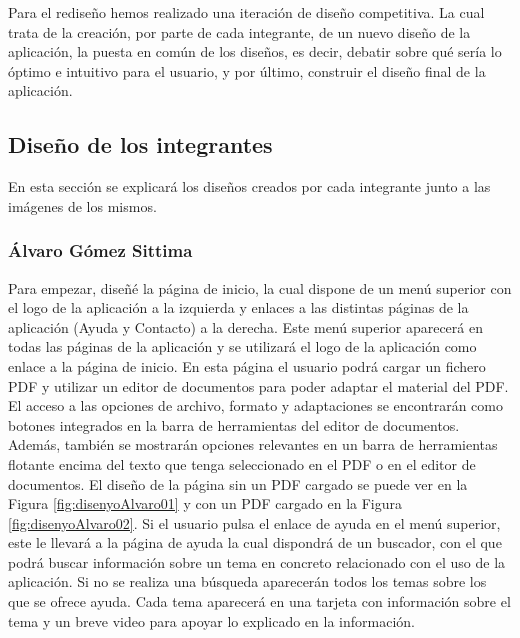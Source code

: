 Para el rediseño hemos realizado una iteración de diseño competitiva. La cual trata de la creación, por parte de cada integrante, de un nuevo diseño de la aplicación, la puesta en común de los diseños, es decir, debatir sobre qué sería lo óptimo e intuitivo para el usuario, y por último, construir el diseño final de la aplicación.

\subsection{Diseño de los integrantes}
En esta sección se explicará los diseños creados por cada integrante junto a las imágenes de los mismos.
\subsubsection{Álvaro Gómez Sittima}
Para empezar, diseñé la página de inicio, la cual dispone de un menú superior con el logo de la aplicación a la izquierda y enlaces a las distintas páginas de la aplicación (Ayuda y Contacto) a la derecha. Este menú superior aparecerá en todas las páginas de la aplicación y se utilizará el logo de la aplicación como enlace a la página de inicio. En esta página el usuario podrá cargar un fichero PDF y utilizar un editor de documentos para poder adaptar el material del PDF. El acceso a las opciones de archivo, formato y adaptaciones se encontrarán como botones integrados en la barra de herramientas del editor de documentos. Además, también se mostrarán opciones relevantes en un barra de herramientas flotante encima del texto que tenga seleccionado en el PDF o en el editor de documentos. El diseño de la página sin un PDF cargado se puede ver en la Figura \ref{fig:disenyoAlvaro01} y con un PDF cargado en la Figura \ref{fig:disenyoAlvaro02}. Si el usuario pulsa el enlace de ayuda en el menú superior, este le llevará a la página de ayuda la cual dispondrá de un buscador, con el que podrá buscar información sobre un tema en concreto relacionado con el uso de la aplicación. Si no se realiza una búsqueda aparecerán todos los temas sobre los que se ofrece ayuda. Cada tema aparecerá en una tarjeta con información sobre el tema y un breve video para apoyar lo explicado en la información.

